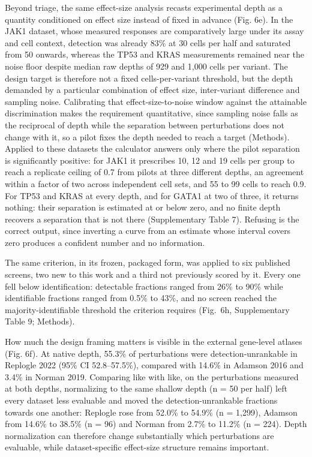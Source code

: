 \documentclass[11pt,letterpaper]{article}
\begin{document}
Beyond triage, the same effect-size analysis recasts experimental depth as a quantity conditioned on effect size instead of fixed in advance (Fig. 6e). In the JAK1 dataset, whose measured responses are comparatively large under its assay and cell context, detection was already 83\% at 30 cells per half and saturated from 50 onwards, whereas the TP53 and KRAS measurements remained near the noise floor despite median raw depths of 929 and 1,000 cells per variant. The design target is therefore not a fixed cells-per-variant threshold, but the depth demanded by a particular combination of effect size, inter-variant difference and sampling noise. Calibrating that effect-size-to-noise window against the attainable discrimination makes the requirement quantitative, since sampling noise falls as the reciprocal of depth while the separation between perturbations does not change with it, so a pilot fixes the depth needed to reach a target (Methods). Applied to these datasets the calculator answers only where the pilot separation is significantly positive: for JAK1 it prescribes 10, 12 and 19 cells per group to reach a replicate ceiling of 0.7 from pilots at three different depths, an agreement within a factor of two across independent cell sets, and 55 to 99 cells to reach 0.9. For TP53 and KRAS at every depth, and for GATA1 at two of three, it returns nothing: their separation is estimated at or below zero, and no finite depth recovers a separation that is not there (Supplementary Table 7). Refusing is the correct output, since inverting a curve from an estimate whose interval covers zero produces a confident number and no information.

The same criterion, in its frozen, packaged form, was applied to six published screens, two new to this work and a third not previously scored by it. Every one fell below identification: detectable fractions ranged from 26\% to 90\% while identifiable fractions ranged from 0.5\% to 43\%, and no screen reached the majority-identifiable threshold the criterion requires (Fig.~6h, Supplementary Table 9; Methods).

How much the design framing matters is visible in the external gene-level atlases (Fig. 6f). At native depth, 55.3\% of perturbations were detection-unrankable in Replogle 2022\cite{Replogle2022} (95\% CI 52.8--57.5\%), compared with 14.6\% in Adamson 2016\cite{Adamson2016} and 3.4\% in Norman 2019\cite{Norman2019}. Comparing like with like, on the perturbations measured at both depths, normalizing to the same shallow depth (n = 50 per half) left every dataset less evaluable and moved the detection-unrankable fractions towards one another: Replogle rose from 52.0\% to 54.9\% (n = 1,299), Adamson from 14.6\% to 38.5\% (n = 96) and Norman from 2.7\% to 11.2\% (n = 224). Depth normalization can therefore change substantially which perturbations are evaluable, while dataset-specific effect-size structure remains important.
\end{document}
